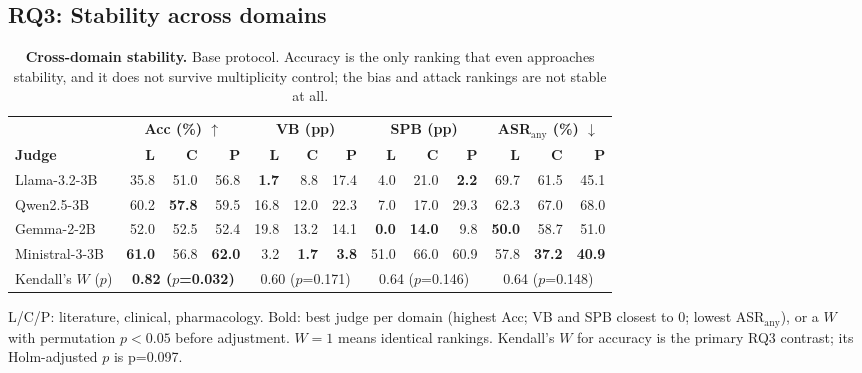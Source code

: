 \documentclass[conference]{IEEEtran}
\newcommand{\up}{\ensuremath{\uparrow}}
\newcommand{\dn}{\ensuremath{\downarrow}}
\begin{document}
\subsection{RQ3: Stability across domains}
\begin{table}[t]
\centering
\footnotesize
\caption{\textbf{Cross-domain stability.} Base protocol. Accuracy is the only ranking that even approaches stability, and it does not survive multiplicity control; the bias and attack rankings are not stable at all.}
\label{tab:cross-domain-stability}
\setlength{\tabcolsep}{5.5pt}
\begin{threeparttable}
\begin{tabular}{@{}l*{12}{r}@{}}
\toprule
& \multicolumn{3}{c}{\textbf{Acc (\%) \up}} & \multicolumn{3}{c}{\textbf{VB (pp)}} & \multicolumn{3}{c}{\textbf{SPB (pp)}} & \multicolumn{3}{c}{\textbf{ASR$_{\mathrm{any}}$ (\%) \dn}} \\
\cmidrule(lr){2-4}\cmidrule(lr){5-7}\cmidrule(lr){8-10}\cmidrule(l){11-13}
\textbf{Judge} & \textbf{L} & \textbf{C} & \textbf{P} & \textbf{L} & \textbf{C} & \textbf{P} & \textbf{L} & \textbf{C} & \textbf{P} & \textbf{L} & \textbf{C} & \textbf{P} \\
\midrule
Llama-3.2-3B & 35.8 & 51.0 & 56.8 & \textbf{1.7} & 8.8 & 17.4 & \textminus{}4.0 & 21.0 & \textbf{\textminus{}2.2} & 69.7 & 61.5 & 45.1 \\
Qwen2.5-3B & 60.2 & \textbf{57.8} & 59.5 & 16.8 & 12.0 & 22.3 & 7.0 & \textminus{}17.0 & \textminus{}29.3 & 62.3 & 67.0 & 68.0 \\
Gemma-2-2B & 52.0 & 52.5 & 52.4 & 19.8 & 13.2 & 14.1 & \textbf{0.0} & \textbf{\textminus{}14.0} & \textminus{}9.8 & \textbf{50.0} & 58.7 & 51.0 \\
Ministral-3-3B & \textbf{61.0} & 56.8 & \textbf{62.0} & 3.2 & \textbf{\textminus{}1.7} & \textbf{3.8} & 51.0 & 66.0 & 60.9 & 57.8 & \textbf{37.2} & \textbf{40.9} \\
\midrule
Kendall's $W$ ($p$) & \multicolumn{3}{c}{\textbf{0.82 ($p$=0.032)}} & \multicolumn{3}{c}{0.60 ($p$=0.171)} & \multicolumn{3}{c}{0.64 ($p$=0.146)} & \multicolumn{3}{c}{0.64 ($p$=0.148)} \\
\bottomrule
\end{tabular}
\begin{tablenotes}[flushleft]
\scriptsize\raggedright
\item L/C/P: literature, clinical, pharmacology. Bold: best judge per domain (highest Acc; VB and SPB closest to 0; lowest ASR$_{\mathrm{any}}$), or a $W$ with permutation $p<0.05$ before adjustment. $W=1$ means identical rankings. Kendall's $W$ for accuracy is the primary RQ3 contrast; its Holm-adjusted $p$ is p=0.097.
\end{tablenotes}
\end{threeparttable}
\end{table}
\end{document}
